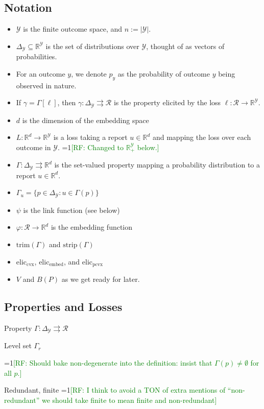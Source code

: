\documentclass[11pt]{colt2019}
\newcommand{\Comments}{1}
\newcommand{\mynote}[2]{\ifnum\Comments=1\textcolor{#1}{#2}\fi}
\newcommand{\raf}[1]{\mynote{green}{[RF: #1]}}
\newcommand{\reals}{\mathbb{R}}
\newcommand{\prop}[1]{\Gamma[#1]}
\newcommand{\eliccvx}{\mathrm{elic}_\mathrm{cvx}}
\newcommand{\elicpoly}{\mathrm{elic}_\mathrm{pcvx}}
\newcommand{\elicembed}{\mathrm{elic}_\mathrm{embed}}
\newcommand{\simplex}{\Delta_\Y}
\newcommand{\R}{\mathcal{R}}
\newcommand{\Y}{\mathcal{Y}}
\newcommand{\toto}{\rightrightarrows}
\newcommand{\strip}{\mathrm{strip}}
\newcommand{\trim}{\mathrm{trim}}
\begin{document}
\subsection{Notation}
\begin{itemize}
	\item $\Y$ is the finite outcome space, and $n := |\Y|$.
	\item $\simplex\subseteq\reals^\Y$ is the set of distributions over $\Y$, thought of as vectors of probabilities.
	\item For an outcome $y$, we denote $p_y$ as the probability of outcome $y$ being observed in nature.
	\item If $\gamma = \prop{\ell}$, then $\gamma:\simplex \toto \R$ is the property elicited by the loss $\ell: \R \to \reals^\Y$.
	\item $d$ is the dimension of the embedding space
	\item $L:\reals^d \to \reals^\Y$ is a loss taking a report $u \in \reals^d$ and mapping the loss over each outcome in $\Y$. \raf{Changed to $\reals^\Y_+$ below.}
	\item $\Gamma: \simplex \toto \reals^d$ is the set-valued property mapping a probability distribution to a report $u \in \reals^d$.
	\item $\Gamma_u = \{ p \in \simplex : u \in \Gamma(p) \}$
	\item $\psi$ is the link function (see below)
	\item $\varphi:\R \to \reals^d$ is the embedding function
	\item $\trim(\Gamma)$ and $\strip(\Gamma)$
	\item $\eliccvx$, $\elicembed$, and $\elicpoly$
	\item $V$ and $B(P)$ as we get ready for later.
\end{itemize}

\subsection{Properties and Losses}
\begin{definition}
  Property $\Gamma:\simplex\toto\R$

  Level set $\Gamma_r$

\raf{Should bake non-degenerate into the definition: insist that $\Gamma(p) \neq \emptyset$ for all $p$.}
  
  Redundant, finite \raf{I think to avoid a TON of extra mentions of ``non-redundant'' we should take finite to mean finite and non-redundant}
\end{definition}
\end{document}
